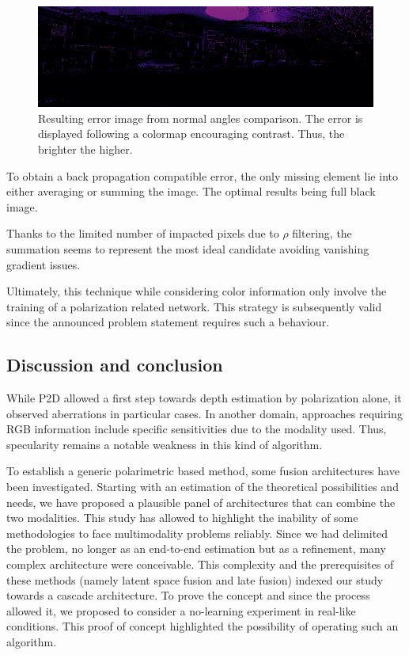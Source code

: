\begin{figure}[h]
	\centering
	\includegraphics[width=0.8\linewidth]{Figures/Fusion/resim}
	\caption[Resulting error image from normal angles comparison.]{Resulting error image from normal angles comparison. The error is displayed following a colormap encouraging contrast. Thus, the brighter the higher.}
	\label{fig:resim}
\end{figure}

To obtain a back propagation compatible error, the only missing element lie into either averaging or summing the image. The optimal results being full black image.

Thanks to the limited number of impacted pixels due to $\rho$ filtering, the summation seems to represent the most ideal candidate avoiding vanishing gradient issues. 

Ultimately, this technique while considering color information only involve the training of a polarization related network. This strategy is subsequently valid since the announced problem statement requires such a behaviour. 

\subsection{Discussion and conclusion}

While P2D allowed a first step towards depth estimation by polarization alone, it observed aberrations in particular cases. 
In another domain, approaches requiring RGB information include specific sensitivities due to the modality used. Thus, specularity remains a notable weakness in this kind of algorithm.

To establish a generic polarimetric based method, some fusion architectures have been investigated. Starting with an estimation of the theoretical possibilities and needs, we have proposed a plausible panel of architectures that can combine the two modalities. This study has allowed to highlight the inability of some methodologies to face multimodality problems reliably. Since we had delimited the problem, no longer as an end-to-end estimation but as a refinement, many complex architecture were conceivable. This complexity and the prerequisites of these methods (namely latent space fusion and late fusion) indexed our study towards a cascade architecture.
To prove the concept and since the process allowed it, we proposed to consider a no-learning experiment in real-like conditions. This proof of concept highlighted the possibility of operating such an algorithm.

